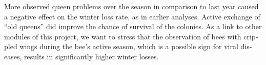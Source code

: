\begin{otherlanguage}{english}
\newline
More observed queen problems over the season in comparison to last year caused a negative effect on the winter loss rate, as in earlier analyses. Active exchange of \enquote{old queens} did improve the chance of survival of the colonies.
\newline
As a link to other modules of this project, we want to stress that the observation of bees with crippled wings during the bee’s active season, which is a possible sign for viral diseases, results in significantly higher winter losses. 
\end{otherlanguage}